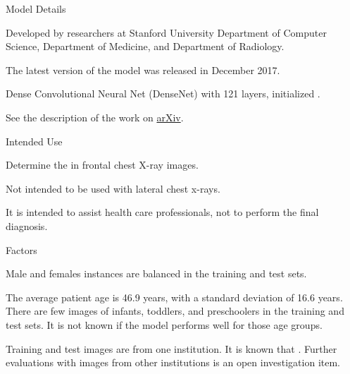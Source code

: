 \documentclass{article}
\begin{document}
\begin{adjustwidth}{-60pt}{-30pt}
\begin{singlespace}

\begin{tcolorbox}[title=\textbf{Model Card - CheXNet},
    breakable, sharp corners, boxrule=0.7pt]

\small{

\begin{mcsection}{Model Details}
    \item Developed by researchers at Stanford University Department of Computer Science, Department of Medicine, and Department of Radiology.
    \item The latest version of the model was released in December 2017.
    \item Dense Convolutional Neural Net (DenseNet) with 121 layers, initialized  \cite{Rajpurkar2017}.
    \item See the description of the work on \href{https://arxiv.org/abs/1711.05225}{arXiv}.
\end{mcsection}

\begin{mcsection}{Intended Use}
    \item Determine the  \cite{Rajpurkar2017}  \cite{OakdenRayner2018a} in frontal chest X-ray images.
    \item Not intended to be used with lateral chest x-rays.
    \item It is intended to assist health care professionals, not to perform the final diagnosis.
\end{mcsection}

\begin{mcsection}{Factors}
    \item Male and females instances are balanced in the training and test sets.
    \item The average patient age is 46.9 years, with a standard deviation of 16.6 years. There are few images of infants, toddlers, and preschoolers in the training and test sets. It is not known if the model performs well for those age groups.
    \item Training and test images are from one institution. It is known that  \cite{Zech2018} \cite{Pooch2019} \cite{Yao2019}. Further evaluations with images from other institutions is an open investigation item.
\end{mcsection}

}
\end{tcolorbox}
\end{singlespace}
\end{adjustwidth}
\end{document}
